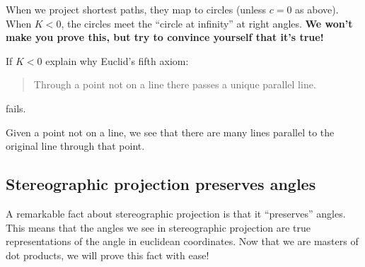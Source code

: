 \documentclass[newpage,hints,12pt,noauthor,nooutcomes,handout]{ximera}
\begin{document}
When we project shortest paths, they map to circles (unless $c=0$ as
above).  When $K<0$, the circles meet the ``circle at infinity'' at
right angles.  \textbf{We won't make you prove this, but try to
  convince yourself that it's true!}

\begin{center}
\end{center}

\begin{problem}
  If $K<0$ explain why Euclid's fifth axiom:
  \begin{quote}
    Through a point not on a line there passes a unique parallel line.
  \end{quote}
  fails.
  \begin{freeResponse}
    Given a point not on a line, we see that there are many lines
    parallel to the original line through that point.
  \end{freeResponse}
\end{problem}







\subsection{Stereographic projection preserves angles}


A remarkable fact about stereographic projection is that it
``preserves'' angles. This means that the angles we see in
stereographic projection are true representations of the angle in
euclidean coordinates.  Now that we are masters of dot products, we
will prove this fact with ease!
\end{document}

